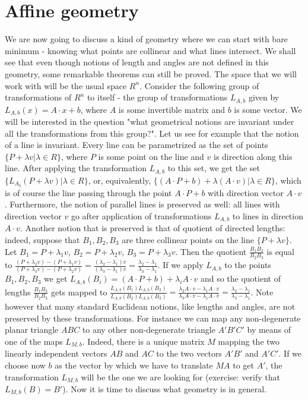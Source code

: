 \section{Affine geometry}
We are now going to discuss a kind of geometry where we can start with bare minimum - knowing what points are collinear and what lines intersect. We shall see that even though notions of length and angles are not defined in this geometry, some remarkable theorems can still be proved.
The space that we will work with will be the usual space $R^n$. Consider the following group of transformations of $R^n$ to itself - the group of transformations $L_{A,b}$ given by $L_{A,b}(x)=A\cdot x + b$, where $A$ is some invertible matrix and $b$ is some vector. We will be interested in the question "what geometrical notions are invariant under all the transformations from this group?".
Let us see for example that the notion of a line is invariant. Every line can be parametrized as the set of points $\{P+\lambda v|\lambda \in R\}$, where $P$ is some point on the line and $v$ is direction along this line. After applying the transformation $L_{A,b}$ to this set, we get the set $\{L_{A_b}(P+\lambda v)|\lambda \in R\}$, or, equivalently, $\{(A\cdot P + b)+\lambda(A\cdot v)|\lambda\in R \}$, which is of course the line passing through the point $A \cdot P + b$ with direction vector $A\cdot v$.
Furthermore, the notion of parallel lines is preserved as well: all lines with direction vector $v$ go after application of transformations $L_{A,b}$ to lines in direction $A\cdot v$.
Another notion that is preserved is that of quotient of directed lengths: indeed, suppose that $B_1,B_2,B_3$ are three collinear points on the line $\{P+\lambda v\}$. Let $B_1=P+\lambda_1 v$, $B_2=P+\lambda_2 v$, $B_3=P+\lambda_3 v$. Then the quotient $\frac{B_1B_2}{B_2B_3}$ is equal to $\frac{(P+\lambda_2 v)-(P+\lambda_1 v)}{(P+\lambda_3 v)-(P+\lambda_2 v)}=\frac{(\lambda_2-\lambda_1)v}{(\lambda_3-\lambda_1)v}=\frac{\lambda_2-\lambda_1}{\lambda_3-\lambda_1}$. If we apply $L_{A,b}$ to the points $B_1,B_2,B_3$ we get $L_{A,b}(B_i)=(A\cdot P+b)+\lambda_i A\cdot v$ and so the quotient of lengths $\frac{B_1B_2}{B_2B_3}$ gets mapped to $\frac{L_{A,b}(B_1)L_{A,b}(B_2)}{L_{A,b}(B_2)L_{A,b}(B_3)}=\frac{\lambda_2 A \cdot v-\lambda_1 A \cdot v}{\lambda_3 A \cdot v-\lambda_1 A \cdot v}=\frac{\lambda_2-\lambda_1}{\lambda_3-\lambda_1}$.
Note however that many standard Euclidean notions, like lengths and angles, are not preserved by these transformations.
For instance we can map any non-degenerate planar triangle $ABC$ to any other non-degenerate triangle $A'B'C'$ by means of one of the maps $L_{M,b}$. Indeed, there is a unique matrix $M$ mapping the two linearly independent vectors $AB$ and $AC$ to the two vectors $A'B'$ and $A'C'$. If we choose now $b$ as the vector by which we have to translate $MA$ to get $A'$, the transformation $L_{M,b}$ will be the one we are looking for (exercise: verify that $L_{M,b}(B)=B'$).
Now it is time to discuss what geometry is in general.
